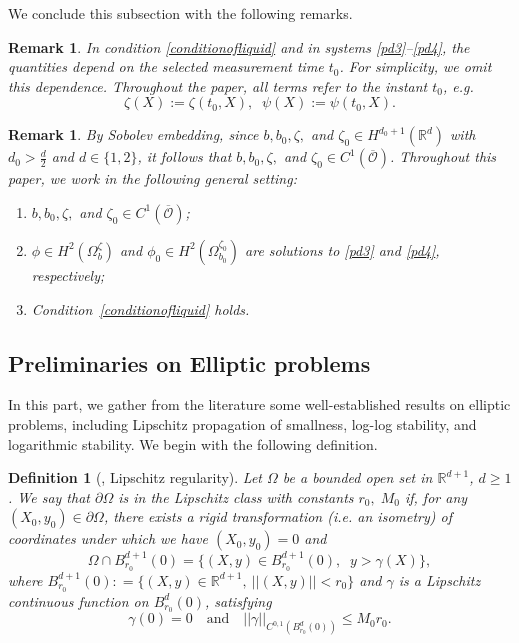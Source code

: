 \documentclass[11pt]{article}
\newtheorem{definition}[theorem]{Definition}
\newtheorem{remark}[theorem]{Remark}
\begin{document}
We conclude this subsection with the following remarks.
\begin{remark}\label{notationt0}
In condition \eqref{conditionofliquid} and in systems \eqref{pd3}–\eqref{pd4}, the quantities depend on the selected measurement time $t_0$. For simplicity, we omit this dependence. Throughout the paper,  all terms refer to the instant $t_0$,  e.g.
$$\zeta(X):=\zeta(t_0,X),\;\; \psi(X):=\psi(t_0,X).$$

\end{remark}
\begin{remark}\label{Assumption of paper}
    By Sobolev embedding, since $b, b_0, \zeta,$ and $\zeta_0 \in H^{d_0+1}(\mathbb{R}^d)$ with $d_0>\frac{d}{2}$ and $d\in\{1,2\}$, it follows that $b, b_0, \zeta,$ and $\zeta_0 \in C^1(\overline{\mathcal{O}})$. Throughout this paper, we work in the following  general setting:
\begin{enumerate}
  \item $b, b_0, \zeta,$ and $\zeta_0 \in C^1(\overline{\mathcal{O}})$;
  \item $\phi \in H^2(\Omega_b^{\zeta})$ and $\phi_0 \in  H^2(\Omega_{b_0}^{\zeta_0})$ are solutions to \eqref{pd3} and \eqref{pd4}, respectively;
  \item Condition~\eqref{conditionofliquid} holds.
\end{enumerate}

\end{remark}

\subsection{Preliminaries on Elliptic problems}
In this part, we gather from the literature some well-established results on elliptic problems, including Lipschitz propagation of smallness, log-log stability, and logarithmic stability. We begin with the following definition.

\begin{definition}[\cite{alessandrini2003size}, Lipschitz regularity]\label{lipsdef}
	Let $\Omega$ be a bounded open set  in $\mathbb{R}^{d+1}$, $d\ge 1$. We  say that $\partial \Omega$ is in the Lipschitz class with constants $r_0,\;M_0$ if, for any $(X_0,y_0)\in\partial \Omega$, there exists a rigid transformation (i.e. an isometry) of coordinates under which we have $(X_0,y_0)=0$ and 
	$$\Omega\cap B^{d+1}_{r_0}(0)=\{ (X,y) \in B^{d+1} _{r_0}(0),\;\;y>\gamma(X)\},$$
	where $B^{d+1}_{r_0}(0) : = \{ (X,y)\in {\mathbb R} ^{d+1},\  ||(X,y)||<r_0\}$ and $\gamma$ is a Lipschitz continuous function on $B_{r_0}^{d}(0)$, satisfying
	$$\gamma(0)=0\quad \text{and}\quad ||\gamma||_{C^{0,1}(B^{d}_{r_0} (0)) }\leq M_0 r_0.$$
	
\end{definition}
\end{document}
